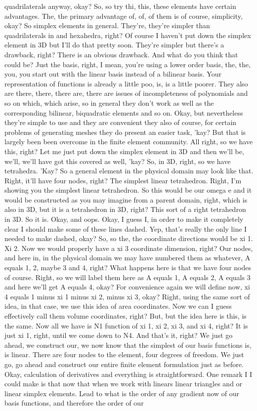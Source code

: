 \documentclass[10pt]{article}
\begin{document}
quadrilaterals anyway, okay? So, so try thi, this, these elements have certain advantages. The, the primary advantage of, of, of them is of course, simplicity, okay? So simplex elements in general. They're, they're simpler than quadrilaterals in and hexahedra, right? Of course I haven't put down the simplex element in 3D but I'll do that pretty soon. They're simpler but there's a drawback, right? There is an obvious drawback. And what do you think that could be? Just the basis, right, I mean, you're using a lower order basis, the, the, you, you start out with the linear basis instead of a bilinear basis. Your representation of functions is already a little poo, is, is a little poorer. They also are there, there, there are, there are issues of incompleteness of polynomials and so on which, which arise, so in general they don't work as well as the corresponding bilinear, biquadratic elements and so on. Okay, but nevertheless they're simple to use and they are convenient they also of course, for certain problems of generating meshes they do present an easier task, 'kay? But that is largely been been overcome in the finite element community. All right, so we have this, right? Let me just put down the simplex element in 3D and then we'll be, we'll, we'll have got this covered as well, 'kay? So, in 3D, right, so we have tetrahedra. 'Kay? So a general element in the physical domain may look like that. Right, it'll have four nodes, right? The simplest linear tetrahedron. Right, I'm showing you the simplest linear tetrahedron. So this would be our omega e and it would be constructed as you may imagine from a parent domain, right, which is also in 3D, but it is a tetrahedron in 3D, right? This sort of a right tetrahedron in 3D. So it is. Okay, and oops. Okay, I guess I, in order to make it completely clear I should make some of these lines dashed. Yep, that's really the only line I needed to make dashed, okay? So, so the, the coordinate directions would be xi 1. Xi 2. Now we would properly have a xi 3 coordinate dimension, right? Our nodes, and here in, in the physical domain we may have numbered them as whatever, A equals 1, 2, maybe 3 and 4, right? What happens here is that we have four nodes of course. Right, so we will label them here as A equals 1, A equals 2, A equals 3 and here we'll get A equals 4, okay? For convenience again we will define now, xi 4 equals 1 minus xi 1 minus xi 2, minus xi 3, okay? Right, using the same sort of idea, in that case, we use this idea of area coordinates. Now we can I guess effectively call them volume coordinates, right? But, but the idea here is this, is the same. Now all we have is N1 function of xi 1, xi 2, xi 3, and xi 4, right? It is just xi 1, right, until we come down to N4. And that's it, right? We just go ahead, we construct our, we now know that the simplest of our basis functions is, is linear. There are four nodes to the element, four degrees of freedom. We just go, go ahead and construct our entire finite element formulation just as before. Okay, calculation of derivatives and everything is straightforward. One remark I  I could make is that now that when we work with linears linear triangles and or linear simplex elements. Lead to what is the order of any gradient now of our basis functions, and therefore the order of our 
\end{document}
